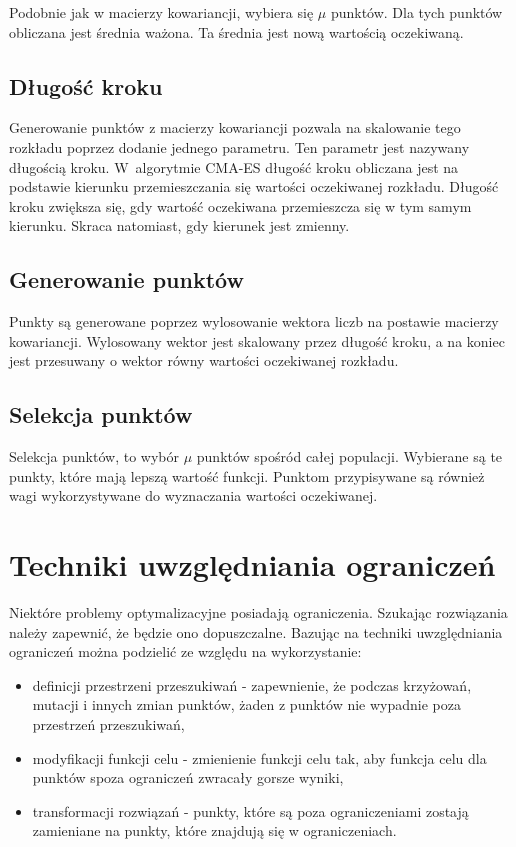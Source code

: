 \documentclass{mini}
\begin{document}
Podobnie jak w macierzy kowariancji, wybiera się $\mu$ punktów. Dla tych punktów obliczana jest średnia ważona. Ta średnia jest nową wartością oczekiwaną.

\subsection{Długość kroku}
Generowanie punktów z macierzy kowariancji pozwala na skalowanie tego rozkładu poprzez dodanie jednego parametru. Ten parametr jest nazywany długością kroku. W~algorytmie CMA-ES długość kroku obliczana jest na podstawie kierunku przemieszczania się wartości oczekiwanej rozkładu. Długość kroku zwiększa się, gdy wartość oczekiwana przemieszcza się w tym samym kierunku. Skraca natomiast, gdy kierunek jest zmienny.

\subsection{Generowanie punktów}
Punkty są generowane poprzez wylosowanie wektora liczb na postawie macierzy kowariancji. Wylosowany wektor jest skalowany przez długość kroku, a na koniec jest przesuwany o wektor równy wartości oczekiwanej rozkładu.

\subsection{Selekcja punktów} \label{selekcjapunktow}
Selekcja punktów, to wybór $\mu$ punktów spośród całej populacji. Wybierane są te punkty, które mają lepszą wartość funkcji. Punktom przypisywane są również wagi wykorzystywane do wyznaczania wartości oczekiwanej.

\pagebreak

\section{Techniki uwzględniania ograniczeń}
Niektóre problemy optymalizacyjne posiadają ograniczenia. Szukając rozwiązania należy zapewnić, że będzie ono dopuszczalne. Bazując na \cite{wyklady} techniki uwzględniania ograniczeń można podzielić ze względu na wykorzystanie:
\begin{itemize}[noitemsep]
\item definicji przestrzeni przeszukiwań - zapewnienie, że podczas krzyżowań, mutacji i innych zmian punktów, żaden z punktów nie wypadnie poza przestrzeń przeszukiwań,
\item modyfikacji funkcji celu - zmienienie funkcji celu tak, aby funkcja celu dla punktów spoza ograniczeń zwracały gorsze wyniki,
\item transformacji rozwiązań - punkty, które są poza ograniczeniami zostają zamieniane na punkty, które znajdują się w ograniczeniach.
\end{itemize}
\end{document}
